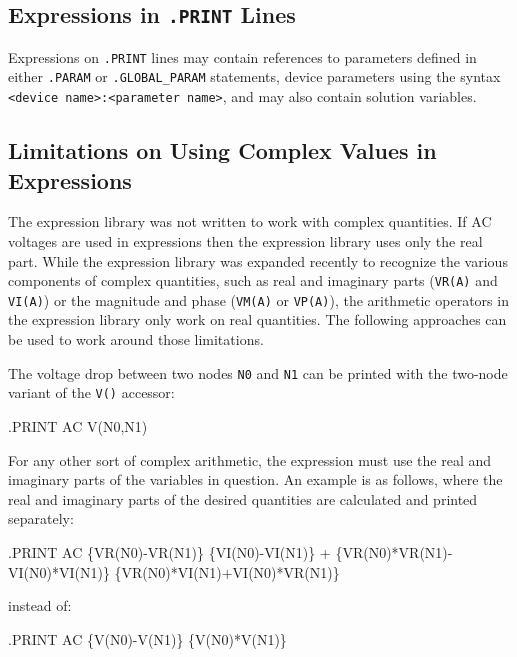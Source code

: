 
\subsection{Expressions in \texttt{.PRINT} Lines}

Expressions on \texttt{.PRINT} lines may contain references to
parameters defined in either \texttt{.PARAM} or
\texttt{.GLOBAL\_PARAM} statements, device parameters using the syntax
\texttt{<device name>:<parameter name>}, and may also contain solution
variables.

\begin{centering}
\end{centering}

\subsection{Limitations on Using Complex Values in Expressions}
\label{ComplexExpressions}
The \Xyce{} expression library was not written to work with complex
quantities.  If AC voltages are used in expressions then the
expression library uses only the real part.  While the expression
library was expanded recently to recognize the various components of
complex quantities, such as real and imaginary parts (\texttt{VR(A)}
and \texttt{VI(A)}) or the magnitude and phase (\texttt{VM(A)} or
\texttt{VP(A)}), the arithmetic operators in the \Xyce{} expression
library only work on real quantities.  The following approaches can be
used to work around those limitations.

The voltage drop between two nodes \texttt{N0} and \texttt{N1} can be
printed with the two-node variant of the \texttt{V()} accessor:
\begin{vquote}
.PRINT AC  V(N0,N1)
\end{vquote}
For any other sort of complex arithmetic, the expression must use the
real and imaginary parts of the variables in question.  An example is
as follows, where the real and imaginary parts of the desired
quantities are calculated and printed separately:
\begin{vquote}
.PRINT AC \{VR(N0)-VR(N1)\} \{VI(N0)-VI(N1)\}
+ \{VR(N0)*VR(N1)-VI(N0)*VI(N1)\} \{VR(N0)*VI(N1)+VI(N0)*VR(N1)\}
\end{vquote}
instead of:
\begin{vquote}
.PRINT AC \{V(N0)-V(N1)\}  \{V(N0)*V(N1)\}
\end{vquote}

